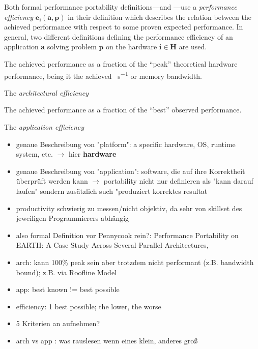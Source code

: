 

Both formal performance portability definitions---\pp and \mpp---use a \textit{performance efficiency} $\mathbf{e_i(a, p)}$ in their definition which describes the relation between the achieved performance with respect to some proven expected performance. 
In general, two different definitions defining the performance efficiency of an application $\mathbf{a}$ solving problem $\mathbf{p}$ on the hardware $\mathbf{i \in H}$ are used. 

\begin{definition}\label{def:arch_eff}
    The achieved performance as a fraction of the \enquote{peak} theoretical hardware performance, being it the achieved \si{\flop\per\second} or memory bandwidth.
\end{definition}

The \textit{architectural efficiency}

\begin{definition}\label{def:app_eff}
    The achieved performance as a fraction of the \enquote{best} observed performance. 
\end{definition}

The \textit{application efficiency}





\newpage
\cite{pennycook_implications_2019}

\begin{itemize}
    \item genaue Beschreibung von "platform": a specific hardware, OS, runtime system, etc. $\rightarrow$ hier \textbf{hardware}
    \item genaue Beschreibung von "application": software, die auf ihre Korrektheit überprüft werden kann $\rightarrow$ portability nicht nur definieren als "kann darauf laufen" sondern zusätzlich such "produziert korrektes resultat
    \item productivity schwierig zu messen/nicht objektiv, da sehr von skillset des jeweiligen Programmierers abhängig
    \item also formal Definition vor Pennycook rein?: Performance Portability on EARTH: A Case Study Across Several Parallel Architectures,
    \item arch: kann 100\% peak sein aber trotzdem nicht performant (z.B. bandwidth bound); z.B. via Roofline Model
    \item app: best known != best possible
    \item efficiency: 1 best possible; the lower, the worse
    \item 5 Kriterien an \pp aufnehmen?
    \item arch vs app : was rauslesen wenn eines klein, anderes groß
\end{itemize}


